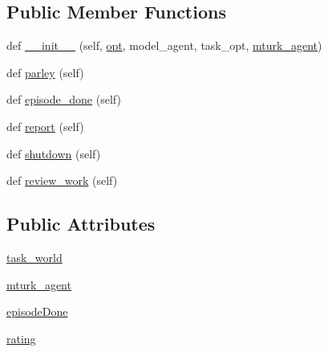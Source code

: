 \subsection*{Public Member Functions}
\begin{DoxyCompactItemize}
\item 
def \hyperlink{classparlai_1_1mturk_1_1tasks_1_1model__evaluator_1_1worlds_1_1ModelEvaluatorWorld_aeb81d4953ba69b9b837d7af56cfd4fed}{\+\_\+\+\_\+init\+\_\+\+\_\+} (self, \hyperlink{classparlai_1_1core_1_1worlds_1_1World_a3640d92718acd3e6942a28c1ab3678bd}{opt}, model\+\_\+agent, task\+\_\+opt, \hyperlink{classparlai_1_1mturk_1_1tasks_1_1model__evaluator_1_1worlds_1_1ModelEvaluatorWorld_a66ed0a06df4c22cfb67c4e92ef99c56b}{mturk\+\_\+agent})
\item 
def \hyperlink{classparlai_1_1mturk_1_1tasks_1_1model__evaluator_1_1worlds_1_1ModelEvaluatorWorld_a7d840b488712356ef04fd9c767f55797}{parley} (self)
\item 
def \hyperlink{classparlai_1_1mturk_1_1tasks_1_1model__evaluator_1_1worlds_1_1ModelEvaluatorWorld_af970226e22092b48371d34168f09f39a}{episode\+\_\+done} (self)
\item 
def \hyperlink{classparlai_1_1mturk_1_1tasks_1_1model__evaluator_1_1worlds_1_1ModelEvaluatorWorld_a4795df492ce6d443379cd5f28671d3bf}{report} (self)
\item 
def \hyperlink{classparlai_1_1mturk_1_1tasks_1_1model__evaluator_1_1worlds_1_1ModelEvaluatorWorld_a5a6662072c9b4eb6e2fd4b4d520bafde}{shutdown} (self)
\item 
def \hyperlink{classparlai_1_1mturk_1_1tasks_1_1model__evaluator_1_1worlds_1_1ModelEvaluatorWorld_a3e83e897cee394c9a11376b8625dff2c}{review\+\_\+work} (self)
\end{DoxyCompactItemize}
\subsection*{Public Attributes}
\begin{DoxyCompactItemize}
\item 
\hyperlink{classparlai_1_1mturk_1_1tasks_1_1model__evaluator_1_1worlds_1_1ModelEvaluatorWorld_ad6bfdd83c43e1eb139f67bdf3816f939}{task\+\_\+world}
\item 
\hyperlink{classparlai_1_1mturk_1_1tasks_1_1model__evaluator_1_1worlds_1_1ModelEvaluatorWorld_a66ed0a06df4c22cfb67c4e92ef99c56b}{mturk\+\_\+agent}
\item 
\hyperlink{classparlai_1_1mturk_1_1tasks_1_1model__evaluator_1_1worlds_1_1ModelEvaluatorWorld_a607bbf834b8145a55dee4200d5fb52b6}{episode\+Done}
\item 
\hyperlink{classparlai_1_1mturk_1_1tasks_1_1model__evaluator_1_1worlds_1_1ModelEvaluatorWorld_a73d88197d0e7992db9726159dc8282fe}{rating}
\end{DoxyCompactItemize}
